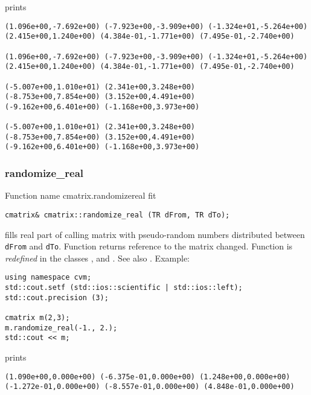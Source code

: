 prints
\begin{Verbatim}
(1.096e+00,-7.692e+00) (-7.923e+00,-3.909e+00) (-1.324e+01,-5.264e+00)
(2.415e+00,1.240e+00) (4.384e-01,-1.771e+00) (7.495e-01,-2.740e+00)

(1.096e+00,-7.692e+00) (-7.923e+00,-3.909e+00) (-1.324e+01,-5.264e+00)
(2.415e+00,1.240e+00) (4.384e-01,-1.771e+00) (7.495e-01,-2.740e+00)

(-5.007e+00,1.010e+01) (2.341e+00,3.248e+00)
(-8.753e+00,7.854e+00) (3.152e+00,4.491e+00)
(-9.162e+00,6.401e+00) (-1.168e+00,3.973e+00)

(-5.007e+00,1.010e+01) (2.341e+00,3.248e+00)
(-8.753e+00,7.854e+00) (3.152e+00,4.491e+00)
(-9.162e+00,6.401e+00) (-1.168e+00,3.973e+00)
\end{Verbatim}
\newpage



\subsubsection{randomize\_real}
Function%
\pdfdest name {cmatrix.randomizereal} fit
\begin{verbatim}
cmatrix& cmatrix::randomize_real (TR dFrom, TR dTo);
\end{verbatim}
fills  real part of  calling matrix with 
pseudo-random numbers distributed between
\verb"dFrom" and \verb"dTo".
Function
returns  reference to the matrix changed.
Function is \emph{redefined} in the classes
,  and
.
See also
.
Example:
\begin{Verbatim}
using namespace cvm;
std::cout.setf (std::ios::scientific | std::ios::left); 
std::cout.precision (3);

cmatrix m(2,3);
m.randomize_real(-1., 2.);
std::cout << m;
\end{Verbatim}
prints
\begin{Verbatim}
(1.090e+00,0.000e+00) (-6.375e-01,0.000e+00) (1.248e+00,0.000e+00)
(-1.272e-01,0.000e+00) (-8.557e-01,0.000e+00) (4.848e-01,0.000e+00)
\end{Verbatim}
\newpage


